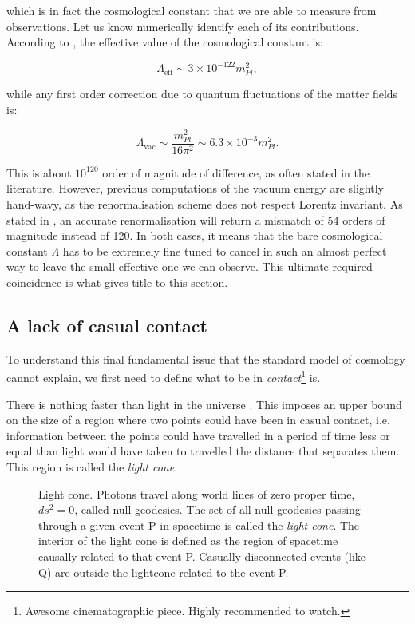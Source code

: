 \documentclass[11pt, a4paper]{article} %
\begin{document}
which is in fact the cosmological constant that we are able to measure from observations. Let us know numerically identify each of its contributions. According to \cite{2020planck}, the effective value of the cosmological constant is:

\begin{equation}\label{eq: lambda_eff}
	\Lambda_{\text{eff}} \sim 3 \times 10^{-122} m^{2}_{Pl},
\end{equation}

while any first order correction due to quantum fluctuations of the matter fields is:

\begin{equation}\label{eq: lambda_vac}
	\Lambda_{\text{vac}} \sim \frac{m^{2}_{Pl}}{16 \pi^{2}} \sim 6.3 \times 10^{-3} m^{2}_{Pl}.
\end{equation}

This is about $10^{120}$ order of magnitude of difference, as often stated in the literature. However, previous computations of the vacuum energy are slightly hand-wavy, as the renormalisation scheme does not respect Lorentz invariant. As stated in \cite{Martin_2012}, an accurate renormalisation will return a mismatch of 54 orders of magnitude instead of 120. In both cases, it means that the bare cosmological constant $\Lambda$ has to be extremely fine tuned to cancel in such an almost perfect way to leave the small effective one we can observe. This ultimate required coincidence is what gives title to this section. 

\subsection*{A lack of casual contact}

To understand this final fundamental issue that the standard model of cosmology cannot explain, we first need to define what to be in \textit{contact}\footnote{Awesome cinematographic piece. Highly recommended to watch.} is.

There is nothing faster than light in the universe \cite{carroll2019spacetime}. This imposes an upper bound on the size of a region where two points could have been in casual contact, i.e. information between the points could have travelled in a period of time less or equal than light would have taken to travelled the distance that separates them. This region is called the \textit{light cone}.
\vspace{0.5cm} %
\begin{figure}[h]
    \centering
    
	\caption{Light cone. Photons travel along world lines of zero proper time, $ds^{2} = 0$, called null geodesics. The set of all null geodesics passing through a given event P in spacetime is called the \textit{light cone}. The interior of the light cone is defined as the region of spacetime causally related to that event P. Casually disconnected events (like Q) are outside the lightcone related to the event P.}
	\label{Fig: light_cone}
\end{figure}
\end{document}
